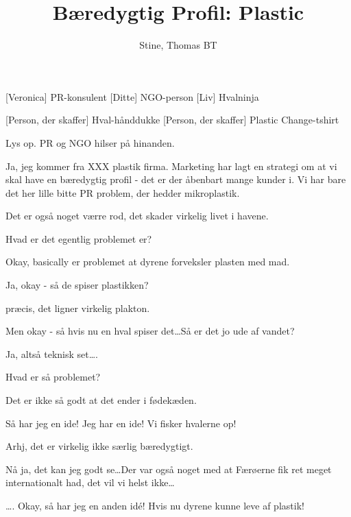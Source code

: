 \documentclass[a4paper,11pt]{article}
\title{Bæredygtig Profil: Plastic}
\author{Stine, Thomas BT}
\begin{document}
\maketitle

\begin{roles}
    [Veronica] PR-konsulent
    [Ditte] NGO-person
    [Liv] Hvalninja
\end{roles}

\begin{props}
    [Person, der skaffer] Hval-hånddukke
    [Person, der skaffer] Plastic Change-tshirt
\end{props}


\begin{sketch}



\scene Lys op. PR og NGO hilser på hinanden. 


 Ja, jeg kommer fra XXX plastik firma. Marketing har lagt en strategi om at vi skal have en bæredygtig profil - det er der åbenbart mange kunder i. Vi har bare det her lille bitte PR problem, der hedder mikroplastik.


 Det er også noget værre rod, det skader virkelig livet i havene. 


 Hvad er det egentlig problemet er? 


 Okay, basically er problemet at dyrene forveksler plasten med mad. 


 Ja, okay - så de spiser plastikken?


 præcis, det ligner virkelig plakton. 


 Men okay - så hvis nu en hval spiser det\ldots Så er det jo ude af vandet? 


 Ja, altså teknisk set\ldots. 


 Hvad er så problemet?


 Det er ikke så godt at det ender i fødekæden. 


 Så har jeg en ide! Jeg har en ide! Vi fisker hvalerne op!


 Arhj, det er virkelig ikke særlig bæredygtigt.


 Nå ja, det kan jeg godt se\ldots Der var også noget med at Færøerne fik ret meget internationalt had, det vil vi helst ikke\ldots 


 \ldots. Okay, så har jeg en anden idé! Hvis nu dyrene kunne leve af plastik! 



\end{sketch}
\end{document}
